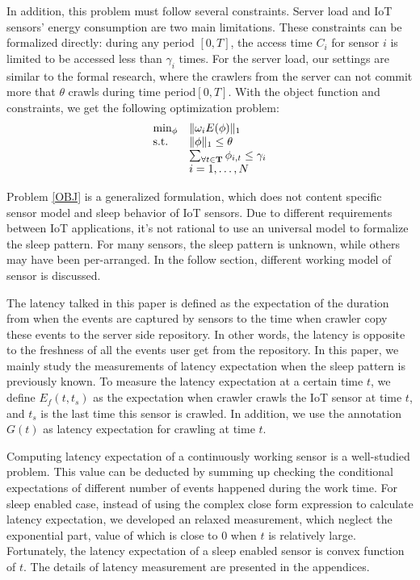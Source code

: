 \documentclass[conference]{IEEEtran}
\begin{document}
In addition, this problem must follow several constraints. Server load and IoT sensors' energy consumption are two main limitations. 
These constraints can be formalized directly: during any period $[0, T]$, the access time $C_i$ for sensor $i$ is limited to be accessed less than $\gamma_i$ times. For the server load, our settings are similar to the formal research\cite{Wolf2002}, where the crawlers from the server can not commit more that $\theta$ crawls during time period$[0, T]$.
With the object function and constraints, we get the following optimization problem:
\begin{eqnarray}
\begin{array}{ll}
\min_{\phi}&\Arrowvert \omega_i E(\phi) \Arrowvert_{1}\\
\text{s.t.}
&\Arrowvert \phi \Arrowvert_{1}\leq\theta\\
&\sum_{\forall t \in \mathbf{T}}{\phi_{i,t}}\leq\gamma_i\\
&i=1,\ldots,N
\end{array}\label{OBJ}
\end{eqnarray}

Problem \eqref{OBJ} is a generalized formulation, which does not content specific sensor model and sleep behavior of IoT sensors. Due to different requirements between IoT applications, it's not rational to use an universal model to formalize the sleep pattern. For many sensors, the sleep pattern is unknown, while others may have been per-arranged.  In the follow section, different working model of sensor is discussed. 

The latency talked in this paper is defined as the expectation of the duration from when the events are captured by sensors to the time when crawler copy these events to the server side repository. In other words, the latency is opposite to the freshness of all the events user get from the repository.
In this paper, we mainly study the measurements of latency expectation when the sleep pattern is previously known.
To measure the latency expectation at a certain time $t$, we define $E_f(t, t_s)$ as the expectation when crawler crawls the IoT sensor at time $t$, and $t_s$ is the last time this sensor is crawled. In addition, we use the annotation $G(t)$ as latency expectation for crawling at time $t$.

Computing latency expectation of a continuously working sensor is a well-studied problem\cite{Cho2000, Wolf2002}. 
This value can be deducted by summing up checking the conditional expectations of different number of events happened during the work time. 
For sleep enabled case, instead of using the complex close form expression to calculate latency expectation, we developed an relaxed measurement, which neglect the exponential part, value of which is close to $0$ when $t$ is relatively large. Fortunately, the latency expectation of a sleep enabled sensor is convex function of $t$.
The details of latency measurement are presented in the appendices. 
\end{document}

